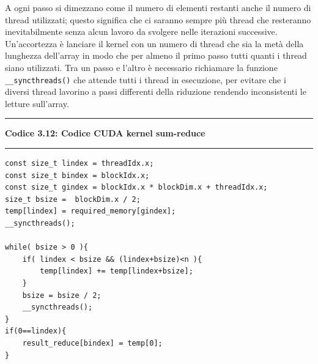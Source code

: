 \documentclass[12pt,a4paper]{report}
\begin{document}
\begin{figure}[H]
\centering
\begin{floatrow}[1]
\end{floatrow}
\end{figure} 
A ogni passo si dimezzano come il numero di elementi restanti anche il numero di thread utilizzati; questo significa che ci saranno sempre più thread che resteranno inevitabilmente senza alcun lavoro da svolgere nelle iterazioni successive. \newline
Un'accortezza è lanciare il kernel con un numero di thread che sia la metà della lunghezza dell'array in modo che per almeno il primo passo tutti quanti i thread siano utilizzati. \newline
Tra un passo e l'altro è necessario richiamare la funzione \verb|__syncthreads()| che attende tutti i thread in esecuzione, per evitare che i diversi thread lavorino a passi differenti della riduzione rendendo inconsistenti le letture sull'array.  \newpage
\noindent\rule[0.5ex]{\linewidth}{2pt}
\small{\textbf{Codice 3.12: Codice CUDA kernel sum-reduce}} \\
\noindent\rule[0.5ex]{\linewidth}{1pt}
\begin{lstlisting}
const size_t lindex = threadIdx.x;
const size_t bindex = blockIdx.x;
const size_t gindex = blockIdx.x * blockDim.x + threadIdx.x;
size_t bsize =  blockDim.x / 2;
temp[lindex] = required_memory[gindex];
__syncthreads();

while( bsize > 0 ){
    if( lindex < bsize && (lindex+bsize)<n ){
        temp[lindex] += temp[lindex+bsize];
    }
    bsize = bsize / 2;
    __syncthreads();
}
if(0==lindex){
    result_reduce[bindex] = temp[0];
} 
\end{lstlisting}
\end{document}
